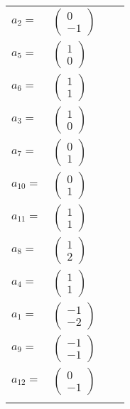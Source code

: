 \documentclass[1p]{elsarticle_modified}
\theoremstyle{definition}
\begin{document}
\begin{tabular}{m{7pt} m{180pt} m{7pt} m{180pt} }
\flushright $a_{2}=$&$\begin{pmatrix}0\\-1\end{pmatrix}$ \\
\flushright $a_{5}=$&$\begin{pmatrix}1\\0\end{pmatrix}$ \\
\flushright $a_{6}=$&$\begin{pmatrix}1\\1\end{pmatrix}$ \\
\flushright $a_{3}=$&$\begin{pmatrix}1\\0\end{pmatrix}$ \\
\flushright $a_{7}=$&$\begin{pmatrix}0\\1\end{pmatrix}$ \\
\flushright $a_{10}=$&$\begin{pmatrix}0\\1\end{pmatrix}$ \\
\flushright $a_{11}=$&$\begin{pmatrix}1\\1\end{pmatrix}$ \\
\flushright $a_{8}=$&$\begin{pmatrix}1\\2\end{pmatrix}$ \\
\flushright $a_{4}=$&$\begin{pmatrix}1\\1\end{pmatrix}$ \\
\flushright $a_{1}=$&$\begin{pmatrix}-1\\-2\end{pmatrix}$ \\
\flushright $a_{9}=$&$\begin{pmatrix}-1\\-1\end{pmatrix}$ \\
\flushright $a_{12}=$&$\begin{pmatrix}0\\-1\end{pmatrix}$\\&\end{tabular}
\end{document}
